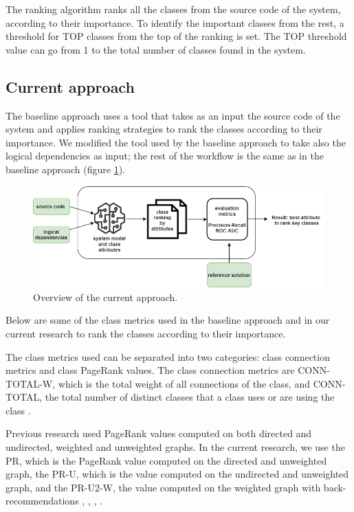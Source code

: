 \documentclass[runningheads]{comsis2}
\begin{document}
The ranking algorithm ranks all the classes from the source code of the system, according to their importance. To identify the important classes from the rest, a threshold for TOP classes from the top of the ranking is set. The TOP threshold value can go from 1 to the total number of classes found in the system. 



\subsection{Current approach}

The baseline approach uses a tool that takes as an input the source code of the system and applies ranking strategies to rank the classes according to their importance. We modified the tool used by the baseline approach to take also the logical dependencies as input; the rest of the workflow is the same as in the baseline approach (figure \ref{fig:baseline_approach}).

\begin{figure}
\centering
\includegraphics[width=\textwidth]{current_approach.PNG}
\caption{Overview of the current approach.}
\label{fig:baseline_approach}
\centering
\end{figure}
Below are some of the class metrics used in the baseline approach and in our current research to rank the classes according to their importance. 

The class metrics used can be separated into two categories: class connection metrics and class PageRank values.
The class connection metrics are CONN-TOTAL-W, which is the total weight of all connections of the class, and CONN-TOTAL, the total number of distinct classes that a class uses or are using the class \cite{Finding-key-classes}.

Previous research used PageRank values computed on both directed and undirected, weighted and unweighted graphs. In the current research, we use the PR, which is the PageRank value computed on the directed and unweighted graph, the PR-U, which is the value computed on the undirected and unweighted graph, and the PR-U2-W, the value computed on the weighted graph with back-recommendations \cite{PagerankENASE}, \cite{enase15}, \cite{Finding-key-classes}, \cite{PagerankSACI}.
\end{document}
